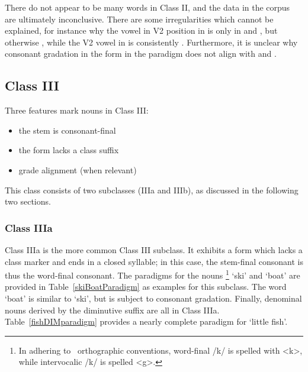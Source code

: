 There do not appear to be many words in Class II, and the data in the corpus are ultimately inconclusive. %
There are some irregularities which cannot be explained, for instance 
why the vowel in V2 position in  is only  in  and , but otherwise , while the V2 vowel in  is consistently . Furthermore, it is unclear why consonant gradation in the  form in the  paradigm does not align with  and . %


\FB


\subsection{Class III}\label{NclassIII}
Three features mark nouns in Class III: 
\begin{itemize}
\item{the stem is consonant-final}
\item{the  form lacks a class suffix}
\item{ grade alignment (when relevant)}
\end{itemize}
This class consists of two subclasses (IIIa and IIIb), as discussed in the following two sections. 


\subsubsection{Class IIIa}\label{NclassIIIa}
Class IIIa is the more common Class III subclass. It exhibits a  form which lacks a class marker and ends in a closed syllable; in this case, the stem-final consonant is thus the word-final consonant. 
The paradigms for the nouns \footnote{In adhering to \PS\ orthographic conventions, word-final /k/ is spelled with <k>, while intervocalic /k/ is spelled <g>.} 
‘ski’ and  ‘boat’ are provided in Table~\vref{skiBoatParadigm} %
as examples for this subclass. %
The word  ‘boat’ is similar to  ‘ski’, but is subject to consonant gradation. %
Finally, denominal nouns derived by the diminutive suffix  are all in Class IIIa. Table~\vref{fishDIMparadigm} provides a nearly complete paradigm for  ‘little fish’. 

